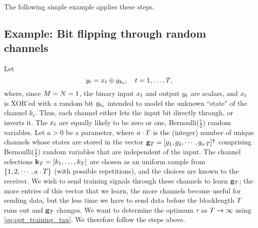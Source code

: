 \documentclass[12pt, draftclsnofoot,journal,onecolumn]{IEEEtran}
\begin{document}
    
    
    
    


The following simple example applies these steps.
\subsection*{Example: Bit flipping through random channels}
\noindent
Let 
\begin{equation}
    y_{t}=x_{t}\oplus g_{k_t},\quad t=1,\ldots,T,
    \label{eq:binary_XOR_channel}
\end{equation}
where, since $M=N=1$, the binary input $x_t$ and output $y_t$ are scalars, and $x_{t}$ is XOR'ed with a random bit $g_{k_t}$ intended to model the unknown ``state" of the channel $k_t$.  Thus, each channel either lets the input bit directly through, or inverts it.  The $x_{t}$ are \iid equally likely to be zero or one, Bernoulli($\frac{1}{2}$) random variables.  Let $a>0$ be a parameter, where $a\cdot T$ is the (integer) number of unique channels whose states are stored in the vector ${\mathbf{g}}_{T}=[g_{1},g_{2},\cdots,g_{a\cdot T}]^{\intercal}$ comprising \iid Bernoulli($\frac{1}{2}$) random variables that are independent of the input. The channel selections ${\mathbf{k}}_{T}=[k_1,\ldots,k_{T}]$ are chosen as an \iid uniform sample from $\{1,2,\cdots,a\cdot T\}$ (with possible repetitions), and the choices are known to the receiver.  We wish to send training signals through these channels to learn ${\mathbf{g}}_{T}$; the more entries of this vector that we learn, the more channels become useful for sending data, but the less time we have to send data before the blocklength $T$ runs out and ${\mathbf{g}}_{T}$ changes.
We want to determine the optimum $\tau$ as $T\to\infty$ using \eqref{eq:opt_training_tau}. We therefore follow the steps above.
\end{document}
